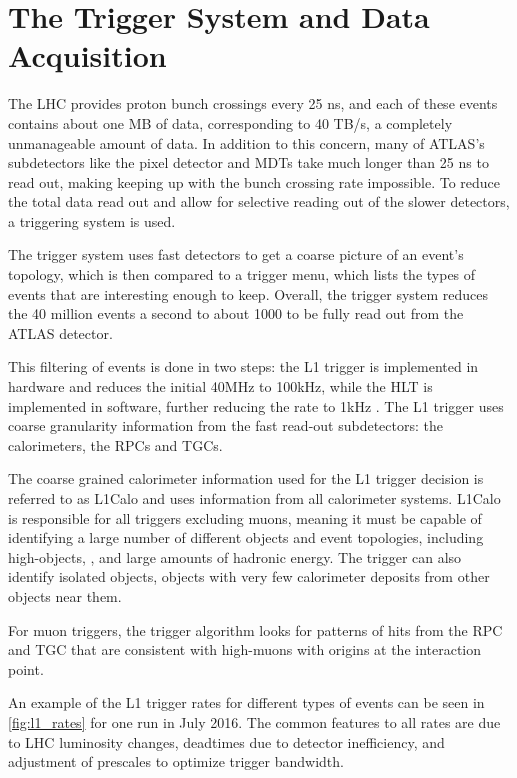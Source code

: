 \section{The Trigger System and Data Acquisition}
\label{sec:Trigger}

The \ac{LHC} provides proton bunch crossings every 25 ns, and each of these events contains about one MB of data, corresponding to 40 TB/s, a completely unmanageable amount of data. In addition to this concern, many of ATLAS's subdetectors like the pixel detector and \acp{MDT} take much longer than 25 ns to read out, making keeping up with the bunch crossing rate impossible. To reduce the total data read out and allow for selective reading out of the slower detectors, a triggering system is used. 

The trigger system uses fast detectors to get a coarse picture of an event's topology, which is then compared to a trigger menu, which lists the types of events that are interesting enough to keep. Overall, the trigger system reduces the 40 million events a second to about 1000 to be fully read out from the ATLAS detector. 

This filtering of events is done in two steps: the \ac{L1} trigger is implemented in hardware and reduces the initial 40MHz to 100kHz, while the \ac{HLT} is implemented in software, further reducing the rate to 1kHz \cite{ATL-DAQ-PUB-2016-001}. The \ac{L1} trigger uses coarse granularity information from the fast read-out subdetectors: the calorimeters, the \acp{RPC} and \acp{TGC}. 

The coarse grained calorimeter information used for the \ac{L1} trigger decision is referred to as \ac{L1Calo} and uses information from all calorimeter systems. \ac{L1Calo} is responsible for all triggers excluding muons, meaning it must be capable of identifying a large number of different objects and event topologies, including high-\pt objects, \met, and large amounts of hadronic energy. The trigger can also identify isolated objects, objects with very few calorimeter deposits from other objects near them.

For muon triggers, the trigger algorithm looks for patterns of hits from the \ac{RPC} and \ac{TGC} that are consistent with high-\pt muons with origins at the interaction point. 

An example of the \ac{L1} trigger rates for different types of events can be seen in \autoref{fig:l1_rates} for one run in July 2016. The common features to all rates are due to \ac{LHC} luminosity changes, deadtimes due to detector inefficiency, and adjustment of prescales to optimize trigger bandwidth.

